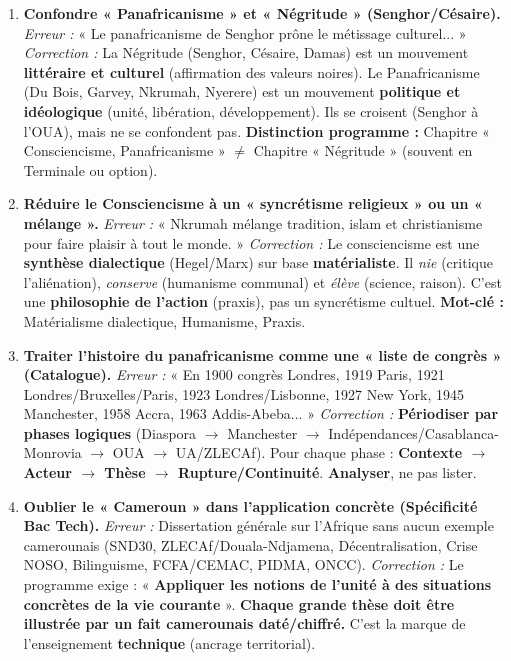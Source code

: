 \documentclass[11pt]{article}
\newcommand{\cle}[1]{{\popxbold\color{popdark}#1}}
\begin{document}
\begin{attention}
\begin{enumerate}
    \item \textbf{Confondre « Panafricanisme » et « Négritude » (Senghor/Césaire).}
    \emph{Erreur :} « Le panafricanisme de Senghor prône le métissage culturel... »
    \emph{Correction :} La \cle{Négritude} (Senghor, Césaire, Damas) est un mouvement \textbf{littéraire et culturel} (affirmation des valeurs noires). Le \cle{Panafricanisme} (Du Bois, Garvey, Nkrumah, Nyerere) est un mouvement \textbf{politique et idéologique} (unité, libération, développement). Ils se croisent (Senghor à l'OUA), mais ne se confondent pas. \textbf{Distinction programme :} Chapitre « Consciencisme, Panafricanisme » $\neq$ Chapitre « Négritude » (souvent en Terminale ou option).
    \item \textbf{Réduire le Consciencisme à un « syncrétisme religieux » ou un « mélange ».}
    \emph{Erreur :} « Nkrumah mélange tradition, islam et christianisme pour faire plaisir à tout le monde. »
    \emph{Correction :} Le consciencisme est une \textbf{synthèse dialectique} (Hegel/Marx) sur base \textbf{matérialiste}. Il \emph{nie} (critique l'aliénation), \emph{conserve} (humanisme communal) et \emph{élève} (science, raison). C'est une \textbf{philosophie de l'action} (praxis), pas un syncrétisme cultuel. \textbf{Mot-clé :} \cle{Matérialisme dialectique}, \cle{Humanisme}, \cle{Praxis}.
    \item \textbf{Traiter l'histoire du panafricanisme comme une « liste de congrès » (Catalogue).}
    \emph{Erreur :} « En 1900 congrès Londres, 1919 Paris, 1921 Londres/Bruxelles/Paris, 1923 Londres/Lisbonne, 1927 New York, 1945 Manchester, 1958 Accra, 1963 Addis-Abeba... »
    \emph{Correction :} \textbf{Périodiser par phases logiques} (Diaspora $\rightarrow$ Manchester $\rightarrow$ Indépendances/Casablanca-Monrovia $\rightarrow$ OUA $\rightarrow$ UA/ZLECAf). Pour chaque phase : \textbf{Contexte $\rightarrow$ Acteur $\rightarrow$ Thèse $\rightarrow$ Rupture/Continuité}. \textbf{Analyser}, ne pas lister.
    \item \textbf{Oublier le « Cameroun » dans l'application concrète (Spécificité Bac Tech).}
    \emph{Erreur :} Dissertation générale sur l'Afrique sans aucun exemple camerounais (SND30, ZLECAf/Douala-Ndjamena, Décentralisation, Crise NOSO, Bilinguisme, FCFA/CEMAC, PIDMA, ONCC).
    \emph{Correction :} Le programme exige : « \textbf{Appliquer les notions de l'unité à des situations concrètes de la vie courante} ». \textbf{Chaque grande thèse doit être illustrée par un fait camerounais daté/chiffré.} C'est la marque de l'enseignement \textbf{technique} (ancrage territorial).

\end{enumerate}
\end{attention}
\end{document}
